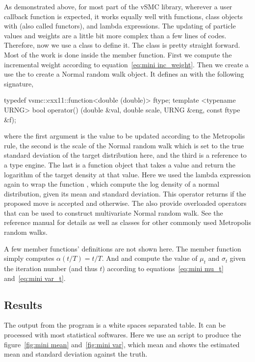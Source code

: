 As demonstrated above, for most part of the vSMC library, wherever a user
callback function is expected, it works equally well with functions, class
objects with  (also called functors), and lambda expressions.
The updating of particle values and weights are a little bit more complex than
a few lines of codes. Therefore, now we use a class to define it.
The class is pretty straight forward. Most of the work is done inside the
 member function. First we compute the incremental weight
according to equation~\eqref{eq:mini inc_weight}. Then we create a use the
 to create a Normal random walk object. It defines an
 with the following signature,
\begin{cppcode}
typedef vsmc::cxx11::function<double (double)> ftype;
template <typename URNG>
bool operator() (double &val, double scale, URNG &eng, const ftype &f);
\end{cppcode}
where the first argument is the value to be updated according to the
Metropolis rule, the second is the scale of the Normal random walk which is
set to the true standard deviation of the target distribution here, and the
third is a reference to a \cppoo type \rng engine. The last is a function
object that takes a value and return the logarithm of the target density at
that value. Here we used the \cppoo lambda expression again to wrap the
function , which compute the log density of a normal
distribution, given its mean and standard deviation. This operator returns
 if the proposed move is accepted and  otherwise. The
 also provide overloaded operators that can be used to
construct multivariate Normal random walk. See the reference manual for
details as well as classes for other commonly used Metropolis random walks.

A few member functions' definitions are not shown here. The member function
 simply computes $\alpha(t/T) = t/T$. And  and 
compute the value of $\mu_t$ and $\sigma_t$ given the iteration number (and
thus $t$) according to equations~\eqref{eq:mini mu_t} and~\eqref{eq:mini
  var_t}.

\subsection{Results}
\label{sub:Results}

The output from the program is a white spaces separated table. It can be
processed with most statistical softwares. Here we use an \rlang script to
produce the figure~\ref{fig:mini mean} and~\ref{fig:mini var}, which mean and
shows the estimated mean and standard deviation against the truth.

